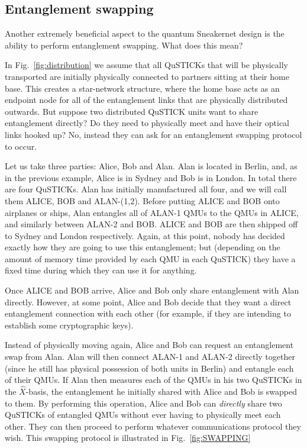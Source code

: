\documentclass[twocolumn, aps, rmp, amsmath, amssymb, nofootinbib, superscriptaddress, longbibliography, floatfix, table-of-contents, eqsecnum]{revtex4-2}
\begin{document}
\subsection{Entanglement swapping}

Another extremely beneficial aspect to the quantum Sneakernet design is the ability to perform entanglement swapping. What does this mean? 

In Fig.~\ref{fig:distribution} we assume that all QuSTICKs that will be physically transported are initially physically connected to partners sitting at their home base. This creates a star-network structure, where the home base acts as an endpoint node for all of the entanglement links that are physically distributed outwards. But suppose two distributed QuSTICK units want to share entanglement directly? Do they need to physically meet and have their optical links hooked up? No, instead they can ask for an entanglement swapping protocol to occur. 

Let us take three parties: Alice, Bob and Alan. Alan is located in Berlin, and, as in the previous example, Alice is in Sydney and Bob is in London. In total there are four QuSTICKs. Alan has initially manufactured all four, and we will call them ALICE, BOB and ALAN-(1,2). Before putting ALICE and BOB onto airplanes or ships, Alan entangles all of ALAN-1 QMUs to the QMUs in ALICE, and similarly between ALAN-2 and BOB. ALICE and BOB are then shipped off to Sydney and London respectively. Again, at this point, nobody has decided exactly how they are going to use this entanglement; but (depending on the amount of memory time provided by each QMU in each QuSTICK) they have a fixed time during which they can use it for anything. 

Once ALICE and BOB arrive, Alice and Bob only share entanglement with Alan directly. However, at some point, Alice and Bob decide that they want a direct entanglement connection with each other (for example, if they are intending to establish some cryptographic keys).

Instead of physically moving again, Alice and Bob can request an entanglement swap from Alan. Alan will then connect ALAN-1 and ALAN-2 directly together (since he still has physical possession of both units in Berlin) and entangle each of their QMUs. If Alan then measures each of the QMUs in his two QuSTICKs in the $\hat{X}$-basis, the entanglement he initially shared with Alice and Bob is swapped to them. By performing this operation, Alice and Bob can \textit{directly} share two QuSTICKs of entangled QMUs without ever having to physically meet each other. They can then proceed to perform whatever communications protocol they wish. This swapping protocol is illustrated in Fig.~\ref{fig:SWAPPING} 
\end{document}
